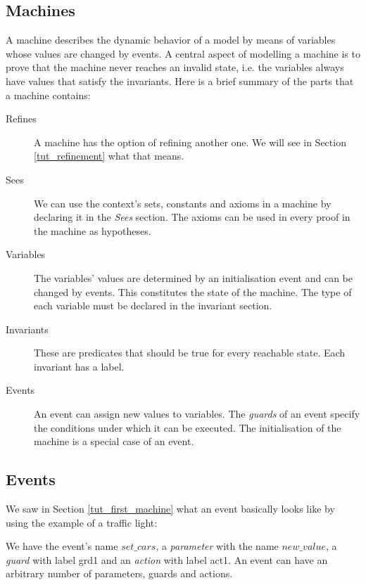 \subsection{Machines}
\label{tut_machines}

A machine describes the dynamic behavior of a model by means of
variables whose values are changed by events.
A central aspect of modelling a machine is to prove that the machine
never reaches an invalid state, i.e. the variables always have values
that satisfy the invariants.
Here is a brief summary of the parts that a machine contains:

\begin{description}
\item[Refines]  A machine has the option of refining another one.
  We will see in Section \ref{tut_refinement} what that means.
\item[Sees]  We can use the context's sets, constants and axioms  in
  a machine by declaring it in the \textsl{Sees} section.
  The axioms can be used in every proof in the machine as hypotheses.
\item[Variables] 
  The variables' values are determined by an initialisation event and
  can be changed by events. This constitutes the state of the machine. The type of each variable must be declared in the invariant section.
\item[Invariants] 
  These are predicates that should be true for every reachable state.
  Each invariant has a label.
\item[Events] 
  An event can assign new values to variables.
  The \emph{guards} of an event specify the conditions under which it can be executed.
  The initialisation of the machine is a special case of an event.
\end{description}

\subsection{Events}
\label{tut_events}

We saw in Section \ref{tut_first_machine} what an event basically looks like by using the example of a traffic light:
\begin{description}
		\begin{description}
		\AnyPrm
			\begin{description}
			\end{description}
		\WhereGrd
			\begin{description}
			\nItemX{ grd1 }{ new\_value \in  BOOL }
			\end{description}
		\ThenAct
			\begin{description}
			\nItemX{ act1 }{ cars\_go :=  new\_value }
			\end{description}
		\EndAct
		\end{description}
\end{description}
We have the event's name $set\_cars$, a \emph{parameter} with the name $new\_value$,
a \emph{guard} with label grd1 and an \emph{action} with label act1.
An event can have an arbitrary number of parameters, guards and actions.

